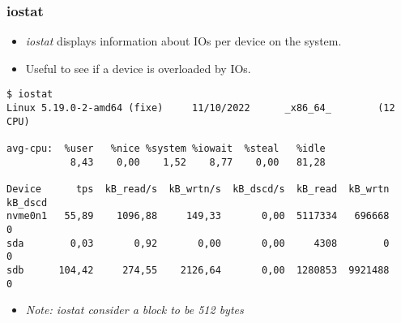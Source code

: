 \begin{frame}[fragile]
  \frametitle{iostat}
  \begin{itemize}
    \item {\em iostat} displays information about IOs per device on the system.
    \item Useful to see if a device is overloaded by IOs. 
  \end{itemize}
  \begin{block}{}
    \begin{verbatim}
$ iostat 
Linux 5.19.0-2-amd64 (fixe)     11/10/2022      _x86_64_        (12 CPU)

avg-cpu:  %user   %nice %system %iowait  %steal   %idle
           8,43    0,00    1,52    8,77    0,00   81,28

Device      tps  kB_read/s  kB_wrtn/s  kB_dscd/s  kB_read  kB_wrtn  kB_dscd
nvme0n1   55,89    1096,88     149,33       0,00  5117334   696668        0
sda        0,03       0,92       0,00       0,00     4308        0        0
sdb      104,42     274,55    2126,64       0,00  1280853  9921488        0
    \end{verbatim}
  \end{block}
  \begin{itemize}
    \item {\em Note: iostat consider a block to be 512 bytes}
  \end{itemize}
\end{frame}

